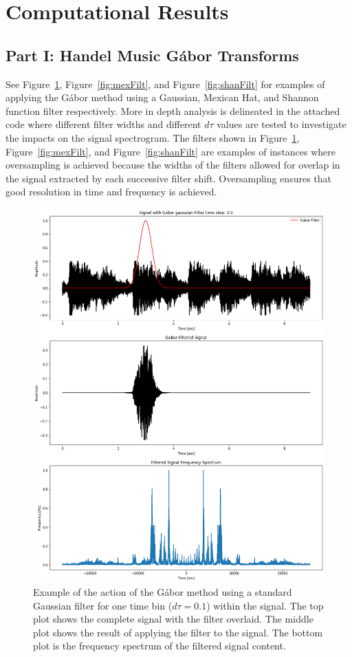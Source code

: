 \documentclass{article}
\begin{document}
\section{Computational Results}
\subsection{Part I: Handel Music G\'abor Transforms}
See Figure~\ref{fig:gaussFilt}, Figure~\ref{fig:mexFilt}, and Figure~\ref{fig:shanFilt} for examples of applying the G\'abor method using a Gaussian, Mexican Hat, and Shannon function filter respectively. More in depth analysis is delineated in the attached code where different filter widths and different $d\tau$ values are tested to investigate the impacts on the signal spectrogram. The filters shown in Figure~\ref{fig:gaussFilt}, Figure~\ref{fig:mexFilt}, and Figure~\ref{fig:shanFilt} are examples of instances where oversampling is achieved because the widths of the filters allowed for overlap in the signal extracted by each successive filter shift. Oversampling ensures that good resolution in time and frequency is achieved.

\begin{figure}
    \centering
    \includegraphics[width=0.435\linewidth]{HW2_DanielBurnham_files/HW2_DanielBurnham_5_2.png}
    \caption{Example of the action of the G\'abor method using a standard Gaussian filter for one time bin ($d\tau = 0.1$) within the signal. The top plot shows the complete signal with the filter overlaid. The middle plot shows the result of applying the filter to the signal. The bottom plot is the frequency spectrum of the filtered signal content.}
    \label{fig:gaussFilt}
\end{figure}
\end{document}
